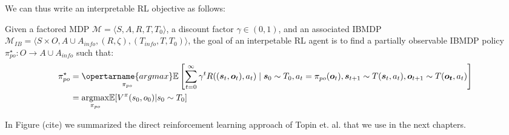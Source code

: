 We can thus write an interpretable RL objective as follows:
\begin{definition}
    Given a factored MDP $\mathcal{M}=\langle S, A, R, T, T_0 \rangle$, a discount factor $\gamma \in (0,1)$, and an associated IBMDP $\mathcal{M}_{IB}=\langle S \times O,A \cup A_{info}, (R, \zeta), (T_{info}, T, T_0)\rangle$, the goal of an interpetable RL agent is to find a partially observable IBMDP policy $\pi^\star_{po}:O\rightarrow A\cup A_{info}$ such that:
\begin{align*}
    \pi^\star_{po} &= \underset{\pi_{po}}{\opertarname{argmax}} \mathbb{E}\left[\sum_{t=0}^{\infty} \gamma^t R((\boldsymbol{s}_t, \boldsymbol{o}_t), a_t) \mid \boldsymbol{s}_0 \sim T_0, a_t = \pi_{po}(\boldsymbol{o}_t), \boldsymbol{s}_{t+1} \sim T(\boldsymbol{s}_t, a_t), \boldsymbol{o}_{t+1}\sim T(\boldsymbol{o_t}, a_t)\right]\\
    &= \underset{\pi_{po}}{\operatorname{argmax}} \mathbb{E}[V^{\pi}(s_0, o_0)| s_0\sim T_0]
\end{align*}
\end{definition}
In Figure (cite) we summarized the direct reinforcement learning approach of Topin et. al. that we use in the next chapters. 
